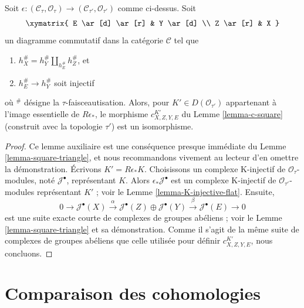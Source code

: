 \begin{lemma}
\label{lemma-descent-squares-helper}
Soit $\epsilon : (\mathcal{C}_\tau, \mathcal{O}_\tau) \to
(\mathcal{C}_{\tau'}, \mathcal{O}_{\tau'})$ comme ci-dessus. Soit
$$
\xymatrix{
E \ar[d] \ar[r] & Y \ar[d] \\
Z \ar[r] & X
}
$$
un diagramme commutatif dans la catégorie $\mathcal{C}$ tel que
\begin{enumerate}
\item $h_X^\# = h_Y^\# \amalg_{h_E^\#} h_Z^\#$, et
\item $h_E^\# \to h_Y^\#$ soit injectif
\end{enumerate}
où ${}^\#$ désigne la $\tau$-faisceautisation. Alors, pour
$K' \in D(\mathcal{O}_{\tau'})$ appartenant à l'image essentielle de
$R\epsilon_*$, le morphisme $c^{K'}_{X, Z, Y, E}$ du Lemme
\ref{lemma-c-square} (construit avec la topologie $\tau'$) est un
isomorphisme.
\end{lemma}

\begin{proof}
Ce lemme auxiliaire est une conséquence presque immédiate du Lemme
\ref{lemma-square-triangle}, et nous recommandons vivement au lecteur d'en
omettre la démonstration. Écrivons $K' = R\epsilon_*K$. Choisissons un
complexe K-injectif de $\mathcal{O}_\tau$-modules, noté
$\mathcal{J}^\bullet$, représentant $K$. Alors
$\epsilon_*\mathcal{J}^\bullet$ est un complexe K-injectif de
$\mathcal{O}_{\tau'}$-modules représentant $K'$ ; voir le Lemme
\ref{lemma-K-injective-flat}. Ensuite,
$$
0 \to
\mathcal{J}^\bullet(X) \xrightarrow{\alpha}
\mathcal{J}^\bullet(Z) \oplus
\mathcal{J}^\bullet(Y) \xrightarrow{\beta}
\mathcal{J}^\bullet(E)
\to 0
$$
est une suite exacte courte de complexes de groupes abéliens ; voir le
Lemme \ref{lemma-square-triangle} et sa démonstration. Comme il s'agit de
la même suite de complexes de groupes abéliens que celle utilisée pour
définir $c^{K'}_{X, Z, Y, E}$, nous concluons.
\end{proof}
\section{Comparaison des cohomologies}
\label{section-compare-general}

